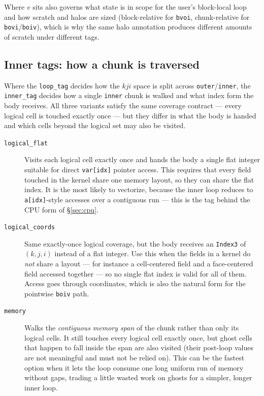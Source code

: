 \documentclass[11pt]{article}
\newcommand{\code}[1]{\lstinline[basicstyle=\ttfamily]|#1|}
\newcommand{\codelbl}[1]{\texttt{#1}}
\begin{document}
Where $v$ sits also governs what state is in scope for the user's block-local
loop and how scratch and halos are sized (block-relative for \code{bvoi},
chunk-relative for \code{bovi}/\code{boiv}), which is why the same halo annotation
produces different amounts of scratch under different tags.

\subsection{Inner tags: how a chunk is traversed}
\label{sec:innertags}

Where the \code{loop_tag} decides how the $kji$ space is split across
\code{outer}/\code{inner}, the \code{inner_tag} decides how a single \code{inner}
chunk is walked and what index form the body receives. All three variants satisfy
the same coverage contract --- every logical cell is touched exactly once --- but
they differ in what the body is handed and which cells beyond the logical set may
also be visited.

\begin{description}
\item[\codelbl{logical\_flat}] Visits each logical cell exactly once and hands the body
  a single flat integer suitable for direct \code{var[idx]} pointer access. This
  requires that every field touched in the kernel share one memory layout, so they
  can share the flat index. It is the most likely to vectorize, because the inner
  loop reduces to \code{a[idx]}-style accesses over a contiguous run --- this is
  the tag behind the CPU form of \S\ref{sec:cpu}.
\item[\codelbl{logical\_coords}] Same exactly-once logical coverage, but the body
  receives an \code{Index3} of $(k,j,i)$ instead of a flat integer. Use this when
  the fields in a kernel do \emph{not} share a layout --- for instance a
  cell-centered field and a face-centered field accessed together --- so no single
  flat index is valid for all of them. Access goes through coordinates, which is
  also the natural form for the pointwise \code{boiv} path.
\item[\codelbl{memory}] Walks the \emph{contiguous memory span} of the chunk rather
  than only its logical cells. It still touches every logical cell exactly once,
  but ghost cells that happen to fall inside the span are also visited (their
  post-loop values are not meaningful and must not be relied on). This can be the
  fastest option when it lets the loop consume one long uniform run of memory
  without gaps, trading a little wasted work on ghosts for a simpler, longer inner
  loop.
\end{description}
\end{document}
